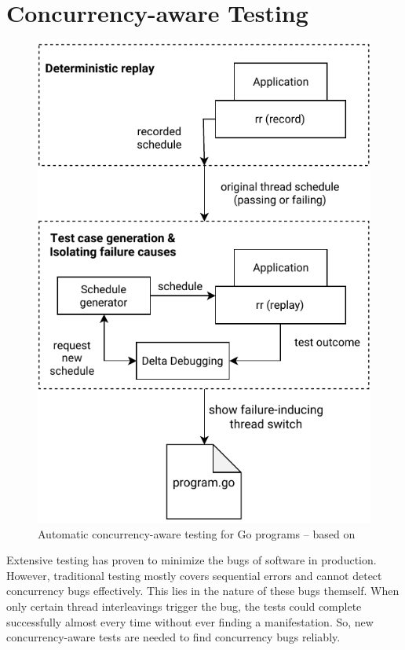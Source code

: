 \documentclass[conference]{IEEEtran}
\begin{document}
\section{Concurrency-aware Testing}
\label{sct:testing}

\begin{figure}
    \includegraphics[width=\linewidth]{figures/Concurrency-Testing.pdf}
    \caption{Automatic concurrency-aware testing for Go programs -- based on\cite{acm2002}}
    \label{fig:testing}
\end{figure}

Extensive testing has proven to minimize the bugs of software in production.\cite{makinen2014testing}
However, traditional testing mostly covers sequential errors and cannot detect concurrency bugs effectively.\cite{lu2008mistakes}
This lies in the nature of these bugs themself.
When only certain thread interleavings trigger the bug, the tests could complete successfully almost every time without ever finding a manifestation.
So, new concurrency-aware tests are needed to find concurrency bugs reliably.
\end{document}
